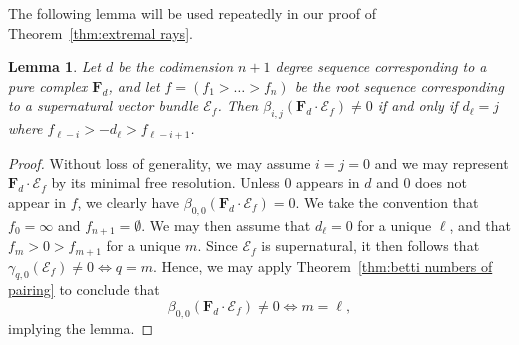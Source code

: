 \documentclass[12pt]{amsart}
\newtheorem{lemma}{Lemma}[section]
\theoremstyle{definition}
\theoremstyle{remark}
\newcommand{\cE}{\mathcal{E}}
\newcommand{\FF}{\mathbf{F}}
\begin{document}
The following lemma will be used repeatedly in our proof of Theorem~\ref{thm:extremal rays}.
\begin{lemma}\label{lem:pure and supernatural}
Let $d$ be the codimension $n+1$ degree sequence corresponding to a pure complex $\FF_d$, and let $f=(f_1>\dots >f_n)$ be the root sequence corresponding to a supernatural vector bundle $\cE_f$.  Then
$
\beta_{i,j}(\FF_d\cdot \cE_f)\ne 0
$
if and only if $d_\ell=j$ where $f_{\ell-i}>-d_{\ell}>f_{\ell-i+1}$.\end{lemma}
\begin{proof}
Without loss of generality, we may assume $i=j=0$ and we may represent $\FF_d\cdot \cE_f$ by its minimal free resolution. Unless $0$ appears in $d$ and $0$ does not appear in $f$, we clearly have $\beta_{0,0}(\FF_d\cdot \cE_f)=0$.  We take the convention that $f_0=\infty$ and $f_{n+1}=\emptyset$. We may then assume that $d_{\ell}=0$ for a unique $\ell$, and that $f_m>0>f_{m+1}$ for a unique $m$.
Since $\cE_f$ is supernatural, it then follows that $\gamma_{q,0}(\cE_f)\ne 0 \iff q=m$.  Hence, we may apply Theorem~\ref{thm:betti numbers of pairing} to conclude that
\[
\beta_{0,0}(\FF_d\cdot \cE_f)\ne 0 \iff m=\ell,
\]
implying the lemma.
\end{proof}
\end{document}
